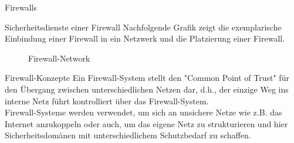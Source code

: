 \begin{section}{Firewalls}
\begin{subsection}{Sicherheitsdienste einer Firewall}
  	Nachfolgende Grafik zeigt die exemplarische Einbindung einer Firewall in ein Netzwerk und die Platzierung einer Firewall.
  	
  	\begin{figure}[htbp]
		\centering
		\caption[Firewall:Network]{Firewall-Network}
		\label{Firewall_Network}
	\end{figure}
  \end{subsection}
  \pagebreak
  
  \label{Firewall-Konzepte}
  \begin{subsection}{Firewall-Konzepte}
  	Ein Firewall-System stellt den "Common Point of Trust" für den Übergang zwischen 
  	unterschiedlichen Netzen dar, d.h., der einzige Weg ins interne Netz führt kontrolliert über das Firewall-System.
  	\\
  	Firewall-Systeme werden verwendet, um sich an unsichere Netze wie z.B. das Internet anzukoppeln 
  	oder auch, um das eigene Netz zu strukturieren und hier 
  	Sicherheitsdomänen mit unterschiedlichem Schutzbedarf zu schaffen.
  	

\end{subsection}
\end{section}
